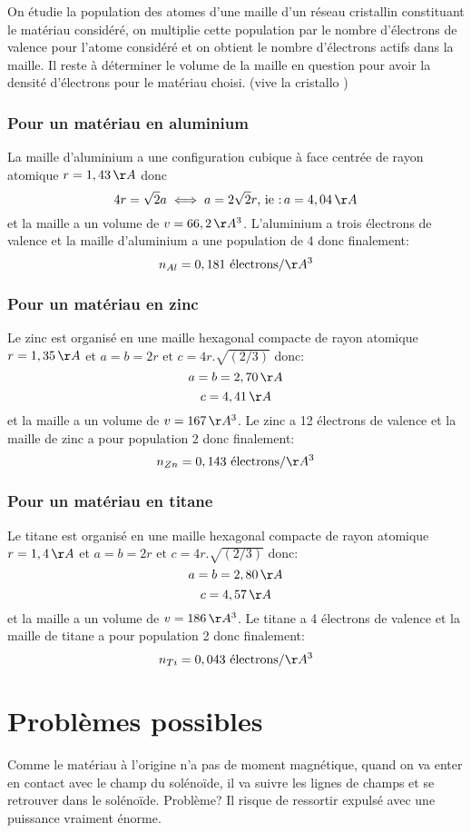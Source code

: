 \documentclass{article}
\begin{document}
On étudie la population des atomes d'une maille d'un réseau cristallin constituant le matériau considéré, on multiplie cette population par le nombre d'électrons de valence pour l'atome considéré et on obtient le nombre d'électrons actifs dans la maille. Il reste à déterminer le volume de la maille en question pour avoir la densité d'électrons pour le matériau choisi. (vive la cristallo \smiley{})
\subsubsection{Pour un matériau en aluminium}

La maille d'aluminium a une configuration cubique à face centrée de rayon atomique $r=1,43\,\AA$ donc $$4r=\sqrt{2}a \iff a = 2\sqrt{2}r \mbox{, ie :} \, a = 4,04\,\AA$$
et la maille a un volume de $v = 66,2 \,\AA^3$. L'aluminium a trois électrons de valence et la maille d'aluminium a une population de 4 donc finalement:
$$n_{Al} = 0,181 \text{ électrons} / \AA^3$$

\subsubsection{Pour un matériau en zinc}
Le zinc est organisé en une maille hexagonal compacte de rayon atomique $r=1,35 \,\AA$ et $a = b = 2r \mbox{ et }c = 4r.\sqrt{(2 / 3)}$ donc:
$$a=b=2,70\,\AA$$
$$c=4,41\,\AA$$
et la maille a un volume de $v = 167\,\AA^3$. Le zinc a 12 électrons de valence et la maille de zinc a pour population 2 donc finalement:
$$n_{Zn} = 0,143 \text{ électrons} / \AA^3$$
\subsubsection{Pour un matériau en titane}
Le titane est organisé en une maille hexagonal compacte de rayon atomique $r=1,4 \,\AA$ et $a = b = 2r \mbox{ et }c = 4r.\sqrt{(2 / 3)}$ donc:
$$a=b=2,80\,\AA$$
$$c=4,57\,\AA$$
et la maille a un volume de $v = 186\,\AA^3$. Le titane a 4 électrons de valence et la maille de titane a pour population 2 donc finalement:
$$n_{Ti} = 0,043 \text{ électrons} / \AA^3$$

\section{Problèmes possibles}
Comme le matériau à l'origine n'a pas de moment magnétique, quand on va enter en contact avec le champ du solénoïde, il va suivre les lignes de champs et se retrouver dans le solénoïde. Problème? Il risque de ressortir expulsé avec une puissance vraiment énorme.
\end{document}

